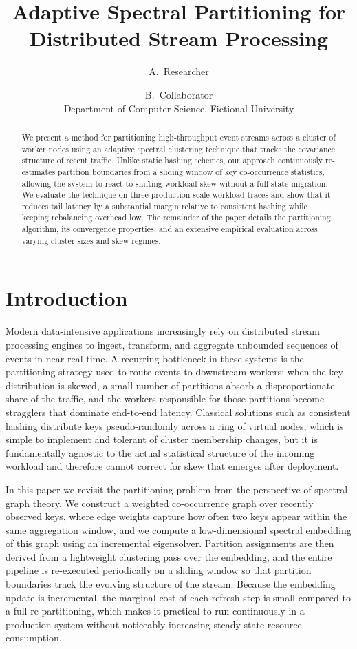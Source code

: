 \documentclass[10pt,twocolumn]{article}
\title{Adaptive Spectral Partitioning for Distributed Stream Processing}
\author{A.\ Researcher \and B.\ Collaborator \\ Department of Computer Science, Fictional University}
\date{}
\begin{document}
\maketitle

\begin{abstract}
We present a method for partitioning high-throughput event streams across a
cluster of worker nodes using an adaptive spectral clustering technique that
tracks the covariance structure of recent traffic. Unlike static hashing
schemes, our approach continuously re-estimates partition boundaries from a
sliding window of key co-occurrence statistics, allowing the system to react
to shifting workload skew without a full state migration. We evaluate the
technique on three production-scale workload traces and show that it reduces
tail latency by a substantial margin relative to consistent hashing while
keeping rebalancing overhead low. The remainder of the paper details the
partitioning algorithm, its convergence properties, and an extensive
empirical evaluation across varying cluster sizes and skew regimes.
\end{abstract}

\section{Introduction}
Modern data-intensive applications increasingly rely on distributed stream
processing engines to ingest, transform, and aggregate unbounded sequences of
events in near real time. A recurring bottleneck in these systems is the
partitioning strategy used to route events to downstream workers: when the
key distribution is skewed, a small number of partitions absorb a
disproportionate share of the traffic, and the workers responsible for those
partitions become stragglers that dominate end-to-end latency. Classical
solutions such as consistent hashing distribute keys pseudo-randomly across a
ring of virtual nodes, which is simple to implement and tolerant of cluster
membership changes, but it is fundamentally agnostic to the actual
statistical structure of the incoming workload and therefore cannot correct
for skew that emerges after deployment.

In this paper we revisit the partitioning problem from the perspective of
spectral graph theory. We construct a weighted co-occurrence graph over
recently observed keys, where edge weights capture how often two keys appear
within the same aggregation window, and we compute a low-dimensional spectral
embedding of this graph using an incremental eigensolver. Partition
assignments are then derived from a lightweight clustering pass over the
embedding, and the entire pipeline is re-executed periodically on a
sliding window so that partition boundaries track the evolving structure of
the stream. Because the embedding update is incremental, the marginal cost of
each refresh step is small compared to a full re-partitioning, which makes it
practical to run continuously in a production system without noticeably
increasing steady-state resource consumption.
\end{document}
